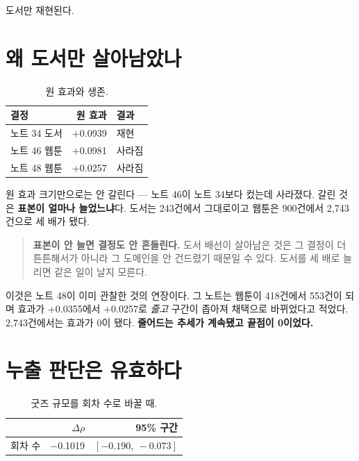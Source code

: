 \documentclass[10pt]{article}
\begin{document}
도서만 재현된다.


\section{왜 도서만 살아남았나}

\begin{table}[t]
\centering\tsize
\caption{원 효과와 생존.}
\begin{tabular}{lrl}
\toprule
결정 & 원 효과 & 결과 \\
\midrule
노트 34 도서 & $+$0.0939 & 재현 \\
노트 46 웹툰 & $+$0.0981 & 사라짐 \\
노트 48 웹툰 & $+$0.0257 & 사라짐 \\
\bottomrule
\end{tabular}
\end{table}

원 효과 크기만으로는 안 갈린다 --- 노트 46이 노트 34보다 컸는데 사라졌다.
갈린 것은 \textbf{표본이 얼마나 늘었느냐}다. 도서는 243건에서 그대로이고
웹툰은 900건에서 2,743건으로 세 배가 됐다.

\begin{quote}\fontsize{9.5}{11.5}\selectfont
\textbf{표본이 안 늘면 결정도 안 흔들린다.} 도서 배선이 살아남은 것은 그
결정이 더 튼튼해서가 아니라 그 도메인을 안 건드렸기 때문일 수 있다. 도서를
세 배로 늘리면 같은 일이 날지 모른다.
\end{quote}

이것은 노트 48이 이미 관찰한 것의 연장이다. 그 노트는 웹툰이 418건에서
553건이 되며 효과가 $+$0.0355에서 $+$0.0257로 \emph{줄고} 구간이 좁아져 채택으로
바뀌었다고 적었다. 2,743건에서는 효과가 0이 됐다. \textbf{줄어드는 추세가
계속됐고 끝점이 0이었다.}

\section{누출 판단은 유효하다}

\begin{table}[t]
\centering\tsize
\caption{굿즈 규모를 회차 수로 바꿀 때.}
\begin{tabular}{lrr}
\toprule
& $\Delta\rho$ & 95\% 구간 \\
\midrule
회차 수 & $-$0.1019 & $[-0.190,\ -0.073]$ \\
\bottomrule
\end{tabular}
\end{table}
\end{document}
